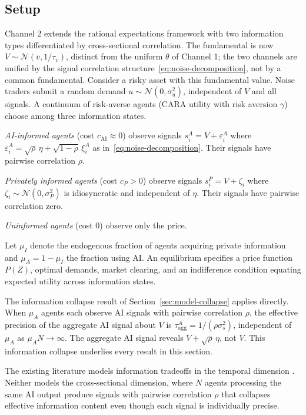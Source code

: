\label{sec:channel2}

\subsection{Setup}

Channel 2 extends the \citet{grossman1980} rational expectations framework with two information types differentiated by cross-sectional correlation. The fundamental is now $V \sim \mathcal{N}(\bar{v}, 1/\tau_v)$, distinct from the uniform $\theta$ of Channel 1; the two channels are unified by the signal correlation structure~\eqref{eq:noise-decomposition}, not by a common fundamental. Consider a risky asset with this fundamental value. Noise traders submit a random demand $u \sim \mathcal{N}(0, \sigma_u^2)$, independent of $V$ and all signals. A continuum of risk-averse agents (CARA utility with risk aversion $\gamma$) choose among three information states.

\emph{AI-informed agents} (cost $c_{\text{AI}} \approx 0$) observe signals $s_i^A = V + \varepsilon_i^A$ where $\varepsilon_i^A = \sqrt{\rho}\,\eta + \sqrt{1-\rho}\,\xi_i^A$ as in~\eqref{eq:noise-decomposition}. Their signals have pairwise correlation $\rho$.

\emph{Privately informed agents} (cost $c_P > 0$) observe signals $s_i^P = V + \zeta_i$ where $\zeta_i \sim \mathcal{N}(0, \sigma_P^2)$ is idiosyncratic and independent of $\eta$. Their signals have pairwise correlation zero.

\emph{Uninformed agents} (cost 0) observe only the price.

Let $\mu_I$ denote the endogenous fraction of agents acquiring private information and $\mu_A = 1 - \mu_I$ the fraction using AI. An equilibrium specifies a price function $P(Z)$, optimal demands, market clearing, and an indifference condition equating expected utility across information states.

The information collapse result of Section~\ref{sec:model-collapse} applies directly. When $\mu_A$ agents each observe AI signals with pairwise correlation $\rho$, the effective precision of the aggregate AI signal about $V$ is $\tau_{\text{agg}}^A = 1/(\rho\sigma_s^2)$, independent of $\mu_A$ as $\mu_A N \to \infty$. The aggregate AI signal reveals $V + \sqrt{\rho}\,\eta$, not $V$. This information collapse underlies every result in this section.

The existing literature models information tradeoffs in the temporal dimension \citep{dugast2018, farboodi2020}. Neither models the cross-sectional dimension, where $N$ agents processing the same AI output produce signals with pairwise correlation $\rho$ that collapses effective information content even though each signal is individually precise.

